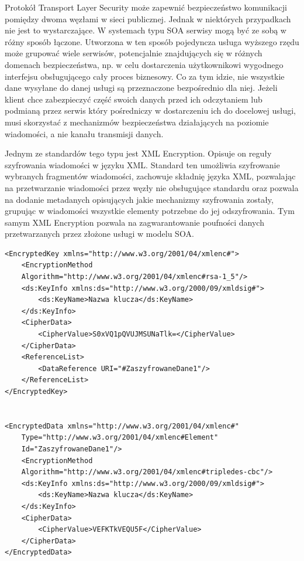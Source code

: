 Protokół Transport Layer Security może zapewnić bezpieczeństwo komunikacji pomiędzy dwoma węzłami w sieci publicznej. Jednak w niektórych przypadkach nie jest to wystarczające. W systemach typu SOA serwisy mogą być ze sobą w różny sposób łączone. Utworzona w ten sposób pojedyncza usługa wyższego rzędu może grupować wiele serwisów, potencjalnie znajdujących się w różnych domenach bezpieczeństwa, np. w celu dostarczenia użytkownikowi wygodnego interfejsu obsługującego cały proces biznesowy. Co za tym idzie, nie wszystkie dane wysyłane do danej usługi są przeznaczone bezpośrednio dla niej. Jeżeli klient chce zabezpieczyć część swoich danych przed ich odczytaniem lub podmianą przez serwis który pośredniczy w dostarczeniu ich do docelowej usługi, musi skorzystać z mechanizmów bezpieczeństwa działających na poziomie wiadomości, a nie kanału transmisji danych.

Jednym ze standardów tego typu jest XML Encryption. Opisuje on reguły szyfrowania wiadomości w języku XML. Standard ten umożliwia szyfrowanie wybranych fragmentów wiadomości, zachowuje składnię języka XML, pozwalając na przetwarzanie wiadomości przez węzły nie obsługujące standardu oraz pozwala na dodanie metadanych opisujących jakie mechanizmy szyfrowania zostały, grupując w wiadomości wszystkie elementy potrzebne do jej odszyfrowania.\cite{kanneganti2008soa}
Tym samym XML Encryption pozwala na zagwarantowanie poufności danych przetwarzanych przez złożone usługi w modelu SOA.

		\begin{lstlisting}
<EncryptedKey xmlns="http://www.w3.org/2001/04/xmlenc#">
	<EncryptionMethod 
	Algorithm="http://www.w3.org/2001/04/xmlenc#rsa-1_5"/>
	<ds:KeyInfo xmlns:ds="http://www.w3.org/2000/09/xmldsig#">
		<ds:KeyName>Nazwa klucza</ds:KeyName>
	</ds:KeyInfo>
	<CipherData>
		<CipherValue>S0xVQ1pQVUJMSUNaTlk=</CipherValue>
	</CipherData>
	<ReferenceList>
		<DataReference URI="#ZaszyfrowaneDane1"/>
	</ReferenceList>
</EncryptedKey>
		
		
<EncryptedData xmlns="http://www.w3.org/2001/04/xmlenc#"
	Type="http://www.w3.org/2001/04/xmlenc#Element"
	Id="ZaszyfrowaneDane1"/>
	<EncryptionMethod 
	Algorithm="http://www.w3.org/2001/04/xmlenc#tripledes-cbc"/>
	<ds:KeyInfo xmlns:ds="http://www.w3.org/2000/09/xmldsig#">
		<ds:KeyName>Nazwa klucza</ds:KeyName>
	</ds:KeyInfo>
	<CipherData>
		<CipherValue>VEFKTkVEQU5F</CipherValue>
	</CipherData>
</EncryptedData>
\end{lstlisting}

